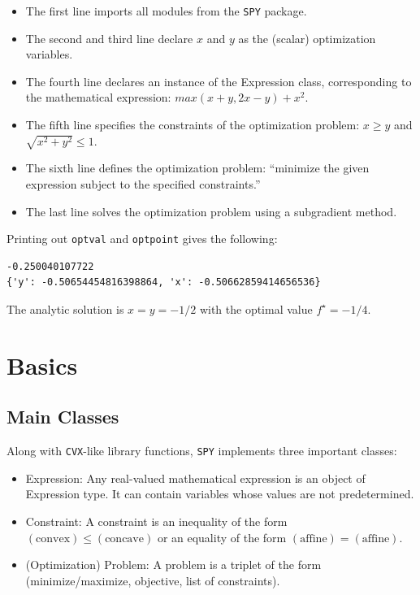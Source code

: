 \documentclass[12pt]{article}
\begin{document}
\begin{itemize}
\item The first line imports all modules from the \verb'SPY' package.
\item The second and third line declare $x$ and $y$ as the (scalar)
  optimization variables.
\item The fourth line declares an instance of the Expression class,
  corresponding to the mathematical expression: $max(x+y,2x-y)+x^2$.
\item The fifth line specifies the constraints of the optimization
  problem: $x \geq y$ and $\sqrt{x^2+y^2} \leq 1$.
\item The sixth line defines the optimization problem: ``minimize the
  given expression subject to the specified constraints.''
\item The last line solves the optimization problem using a
  subgradient method.
\end{itemize}

\noindent Printing out \verb'optval' and \verb'optpoint' gives the following:
\begin{verbatim}
-0.250040107722
{'y': -0.50654454816398864, 'x': -0.50662859414656536}
\end{verbatim}
The analytic solution is $x=y=-1/2$ with the optimal value $f^\star = -1/4$.

\section{Basics}

\subsection{Main Classes}
Along with \verb'CVX'-like library functions, \verb'SPY' implements three
important classes:
\begin{itemize}
\item Expression: Any real-valued mathematical expression is an object
of Expression type. It can contain variables whose values are not
predetermined.
\item Constraint: A constraint is an inequality of the form
$(\mbox{convex}) \le (\mbox{concave})$ or an equality of the form
$(\mbox{affine}) = (\mbox{affine})$.
\item (Optimization) Problem: A problem is a triplet of the form (minimize/maximize, objective, list of constraints).
\end{itemize}
\end{document}
